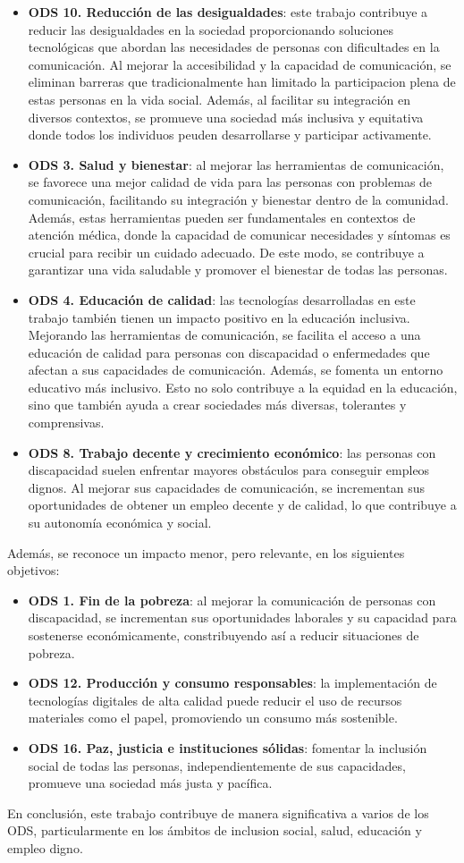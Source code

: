 \documentclass[11pt]{article}
\begin{document}
\begin{itemize}
	\item \textbf{ODS 10. Reducción de las desigualdades}: este trabajo contribuye a reducir las desigualdades en la sociedad proporcionando soluciones tecnológicas que abordan las necesidades de personas con dificultades en la comunicación. Al mejorar la accesibilidad y la capacidad de comunicación, se eliminan barreras que tradicionalmente han limitado la participacion plena de estas personas en la vida social. Además, al facilitar su integración en diversos contextos, se promueve una sociedad más inclusiva y equitativa donde todos los individuos peuden desarrollarse y participar activamente.
	\item \textbf{ODS 3. Salud y bienestar}: al mejorar las herramientas de comunicación, se favorece una mejor calidad de vida para las personas con problemas de comunicación, facilitando su integración y bienestar dentro de la comunidad. Además, estas herramientas pueden ser fundamentales en contextos de atención médica, donde la capacidad de comunicar necesidades y síntomas es crucial para recibir un cuidado adecuado. De este modo, se contribuye a garantizar una vida saludable y promover el bienestar de todas las personas.
	\item \textbf{ODS 4. Educación de calidad}: las tecnologías desarrolladas en este trabajo también tienen un impacto positivo en la educación inclusiva. Mejorando las herramientas de comunicación, se facilita el acceso a una educación de calidad para personas con discapacidad o enfermedades que afectan a sus capacidades de comunicación. Además, se fomenta un entorno educativo más inclusivo. Esto no solo contribuye a la equidad en la educación, sino que también ayuda a crear sociedades más diversas, tolerantes y comprensivas.
	\item \textbf{ODS 8. Trabajo decente y crecimiento económico}: las personas con discapacidad suelen enfrentar mayores obstáculos para conseguir empleos dignos. Al mejorar sus capacidades de comunicación, se incrementan sus oportunidades de obtener un empleo decente y de calidad, lo que contribuye a su autonomía económica y social.
\end{itemize}

Además, se reconoce un impacto menor, pero relevante, en los siguientes objetivos:

\begin{itemize}
	\item \textbf{ODS 1. Fin de la pobreza}: al mejorar la comunicación de personas con discapacidad, se incrementan sus oportunidades laborales y su capacidad para sostenerse económicamente, constribuyendo así a reducir situaciones de pobreza.
	\item \textbf{ODS 12. Producción y consumo responsables}: la implementación de tecnologías digitales de alta calidad puede reducir el uso de recursos materiales como el papel, promoviendo un consumo más sostenible.
	\item \textbf{ODS 16. Paz, justicia e instituciones sólidas}: fomentar la inclusión social de todas las personas, independientemente de sus capacidades, promueve una sociedad más justa y pacífica.
\end{itemize}

En conclusión, este trabajo contribuye de manera significativa a varios de los ODS, particularmente en los ámbitos de inclusion social, salud, educación y empleo digno.
\end{document}
